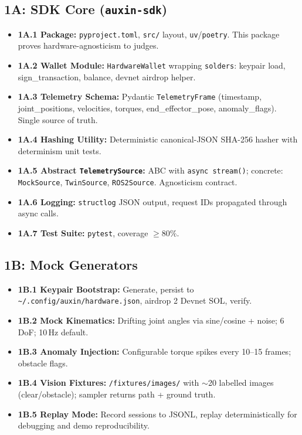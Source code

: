 \documentclass[11pt, a4paper]{article}
\begin{document}
\subsection*{1A: SDK Core (\texttt{auxin-sdk})}
\begin{itemize}
    \item \textbf{1A.1 Package:} \texttt{pyproject.toml}, \texttt{src/} layout, \texttt{uv}/\texttt{poetry}. This package proves hardware-agnosticism to judges.
    \item \textbf{1A.2 Wallet Module:} \texttt{HardwareWallet} wrapping \texttt{solders}: keypair load, sign\_transaction, balance, devnet airdrop helper.
    \item \textbf{1A.3 Telemetry Schema:} Pydantic \texttt{TelemetryFrame} (timestamp, joint\_positions, velocities, torques, end\_effector\_pose, anomaly\_flags). Single source of truth.
    \item \textbf{1A.4 Hashing Utility:} Deterministic canonical-JSON SHA-256 hasher with determinism unit tests.
    \item \textbf{1A.5 Abstract \texttt{TelemetrySource}:} ABC with \texttt{async stream()}; concrete: \texttt{MockSource}, \texttt{TwinSource}, \texttt{ROS2Source}. Agnosticism contract.
    \item \textbf{1A.6 Logging:} \texttt{structlog} JSON output, request IDs propagated through async calls.
    \item \textbf{1A.7 Test Suite:} \texttt{pytest}, coverage $\geq 80\%$.
\end{itemize}

\subsection*{1B: Mock Generators}
\begin{itemize}
    \item \textbf{1B.1 Keypair Bootstrap:} Generate, persist to \texttt{\textasciitilde/.config/auxin/hardware.json}, airdrop 2 Devnet SOL, verify.
    \item \textbf{1B.2 Mock Kinematics:} Drifting joint angles via sine/cosine + noise; 6 DoF; 10\,Hz default.
    \item \textbf{1B.3 Anomaly Injection:} Configurable torque spikes every 10--15 frames; obstacle flags.
    \item \textbf{1B.4 Vision Fixtures:} \texttt{/fixtures/images/} with $\sim$20 labelled images (clear/obstacle); sampler returns path + ground truth.
    \item \textbf{1B.5 Replay Mode:} Record sessions to JSONL, replay deterministically for debugging and demo reproducibility.
\end{itemize}
\end{document}
